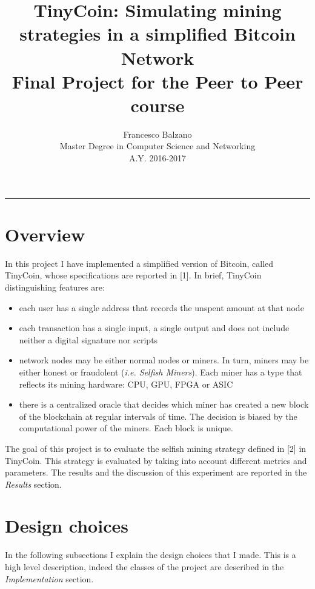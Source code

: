 \documentclass{article}
\title{ \textbf {\vspace{0.5cm}\Huge TinyCoin: Simulating mining strategies in a simplified Bitcoin Network\\ \vspace{0.5cm}}
 Final Project for the Peer to Peer course \vspace{1.0cm}\\}
\date{\vspace{1.7cm}}
\author{ \Large Francesco Balzano \vspace{0.3cm}\\ 
\Large Master Degree in Computer Science and Networking \vspace{0.4cm} \\
\Large A.Y. 2016-2017 
}
\begin{document}
  \maketitle
  \noindent\rule{18cm}{0.4pt}
  \tableofcontents
  \newpage

\clearpage
\setcounter{page}{2}
  
\section{Overview}  
In this project I have implemented a simplified version of Bitcoin, called TinyCoin, whose specifications are reported in [1]. In brief, TinyCoin distinguishing features are:
\begin{itemize}
\item each user has a single address that records the unspent amount at that node
\item each transaction has a single input, a single output and does not include neither a digital signature nor scripts
\item network nodes may be either normal nodes or miners. In turn, miners may be either honest or fraudolent (\textit{i.e. Selfish Miners}). Each miner has a type that reflects its mining hardware: CPU, GPU, FPGA or ASIC
\item there is a centralized oracle that decides which miner has created a new block of the blockchain at regular intervals of time. The decision is biased by the computational power of the miners. Each block is unique. \\
\end{itemize}
The goal of this project is to evaluate the selfish mining strategy defined in [2] in TinyCoin. This strategy is evaluated by taking into account different metrics and parameters. The results and the discussion of this experiment are reported in the \textit{Results} section.

\section{Design choices}
In the following subsections I explain the design choices that I made. This is a high level description, indeed the classes of the project are described in the \textit{Implementation} section.
\end{document}
